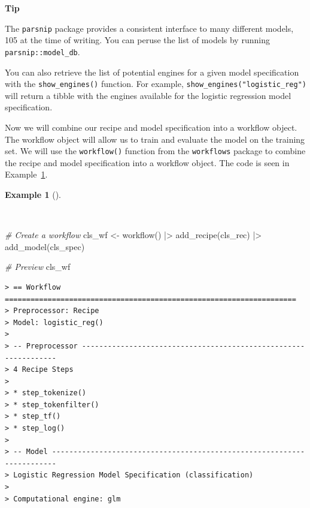 \documentclass[
  letterpaper,
  DIV=11,
  numbers=noendperiod]{scrreprt}
\newenvironment{Shaded}{\begin{snugshade}}{\end{snugshade}}
\newcommand{\CommentTok}[1]{\textcolor[rgb]{0.00,0.00,0.00}{\textit{#1}}}
\newcommand{\FunctionTok}[1]{\textcolor[rgb]{0.00,0.00,0.00}{#1}}
\newcommand{\NormalTok}[1]{\textcolor[rgb]{0.00,0.00,0.00}{#1}}
\newcommand{\OtherTok}[1]{\textcolor[rgb]{0.00,0.00,0.00}{#1}}
\newcommand{\SpecialCharTok}[1]{\textcolor[rgb]{0.00,0.00,0.00}{#1}}
\theoremstyle{definition}
\newtheorem{example}{Example}[chapter]
\theoremstyle{remark}
\begin{document}
\begin{tcolorbox}[enhanced jigsaw, leftrule=.75mm, colframe=quarto-callout-color-frame, colback=white, rightrule=.15mm, opacityback=0, arc=.35mm, breakable, bottomrule=.15mm, left=2mm, toprule=.15mm]

\textbf{ Tip}

The \texttt{parsnip} package provides a consistent interface to many
different models, 105 at the time of writing. You can peruse the list of
models by running \texttt{parsnip::model\_db}.

You can also retrieve the list of potential engines for a given model
specification with the \texttt{show\_engines()} function. For example,
\texttt{show\_engines("logistic\_reg")} will return a tibble with the
engines available for the logistic regression model specification.

\end{tcolorbox}

Now we will combine our recipe and model specification into a workflow
object. The workflow object will allow us to train and evaluate the
model on the training set. We will use the \texttt{workflow()} function
from the \texttt{workflows} package to combine the recipe and model
specification into a workflow object. The code is seen in
Example~\ref{exm-pda-class-workflow}.

\begin{example}[]\protect\hypertarget{exm-pda-class-workflow}{}\label{exm-pda-class-workflow}

~

\begin{Shaded}
\begin{Highlighting}[]
\CommentTok{\# Create a workflow}
\NormalTok{cls\_wf }\OtherTok{\textless{}{-}}
  \FunctionTok{workflow}\NormalTok{() }\SpecialCharTok{|\textgreater{}}
  \FunctionTok{add\_recipe}\NormalTok{(cls\_rec) }\SpecialCharTok{|\textgreater{}}
  \FunctionTok{add\_model}\NormalTok{(cls\_spec)}

\CommentTok{\# Preview}
\NormalTok{cls\_wf}
\end{Highlighting}
\end{Shaded}

\begin{verbatim}
> == Workflow ====================================================================
> Preprocessor: Recipe
> Model: logistic_reg()
> 
> -- Preprocessor ----------------------------------------------------------------
> 4 Recipe Steps
> 
> * step_tokenize()
> * step_tokenfilter()
> * step_tf()
> * step_log()
> 
> -- Model -----------------------------------------------------------------------
> Logistic Regression Model Specification (classification)
> 
> Computational engine: glm
\end{verbatim}

\end{example}
\end{document}
